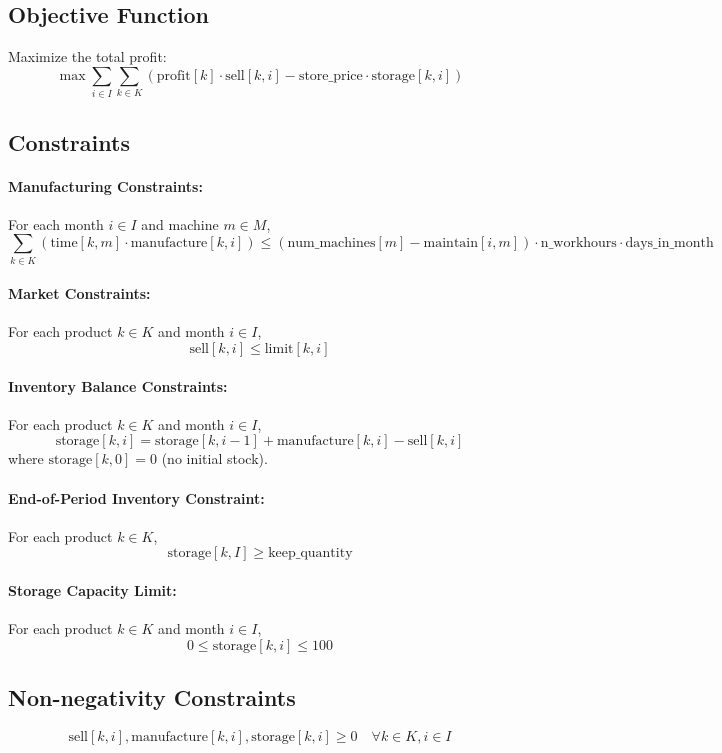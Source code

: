 \documentclass{article}
\begin{document}
\subsection*{Objective Function}
Maximize the total profit:
\[
\max \sum_{i \in I} \sum_{k \in K} \left( \text{profit}[k] \cdot \text{sell}[k, i] - \text{store\_price} \cdot \text{storage}[k, i] \right)
\]

\subsection*{Constraints}

\paragraph{Manufacturing Constraints:}
For each month $i \in I$ and machine $m \in M$,
\[
\sum_{k \in K} \left(\text{time}[k, m] \cdot \text{manufacture}[k, i]\right) \leq \left( \text{num\_machines}[m] - \text{maintain}[i, m] \right) \cdot \text{n\_workhours} \cdot \text{days\_in\_month}
\]

\paragraph{Market Constraints:}
For each product $k \in K$ and month $i \in I$,
\[
\text{sell}[k, i] \leq \text{limit}[k, i]
\]

\paragraph{Inventory Balance Constraints:}
For each product $k \in K$ and month $i \in I$,
\[
\text{storage}[k, i] = \text{storage}[k, i-1] + \text{manufacture}[k, i] - \text{sell}[k, i]
\]
where \(\text{storage}[k, 0] = 0\) (no initial stock).

\paragraph{End-of-Period Inventory Constraint:}
For each product $k \in K$,
\[
\text{storage}[k, I] \geq \text{keep\_quantity}
\]

\paragraph{Storage Capacity Limit:}
For each product $k \in K$ and month $i \in I$,
\[
0 \leq \text{storage}[k, i] \leq 100
\]

\subsection*{Non-negativity Constraints}
\[
\text{sell}[k, i], \text{manufacture}[k, i], \text{storage}[k, i] \geq 0 \quad \forall k \in K, i \in I
\]
\end{document}
